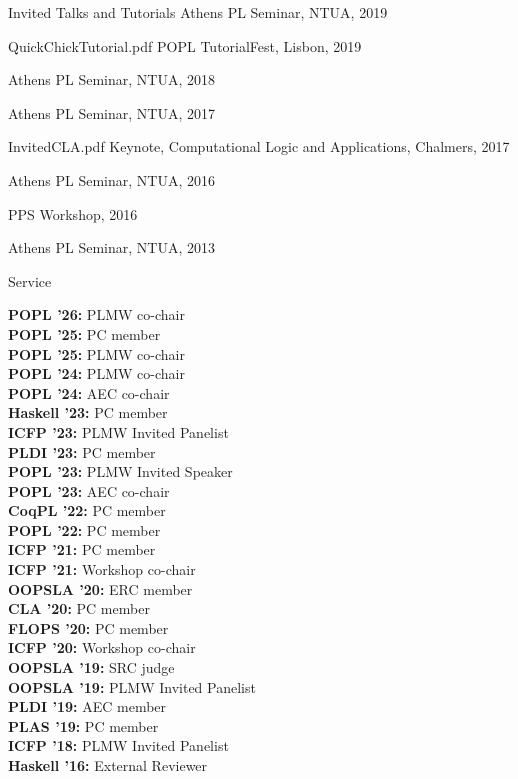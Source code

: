 \documentclass{resume} %
\begin{document}
\begin{rSection}{Invited Talks and Tutorials}
     {}
     {Athens PL Seminar, NTUA, 2019}

    {}
    {}
  
    {QuickChickTutorial.pdf}
    {POPL TutorialFest, Lisbon, 2019}

     {}
     {Athens PL Seminar, NTUA, 2018}

     {}
     {Athens PL Seminar, NTUA, 2017}

     {InvitedCLA.pdf}
     {Keynote, Computational Logic and Applications, Chalmers, 2017}

     {}
     {Athens PL Seminar, NTUA, 2016}

     {}
     {PPS Workshop, 2016}

     {}
     {Athens PL Seminar, NTUA, 2013}
     
\end{rSection}


\newcommand{\serve}[2]{
  {\bf #1:} #2 \\
  }


\begin{rSection}{Service}

  \serve{POPL '26}{PLMW co-chair}
  \serve{POPL '25}{PC member}  
  \serve{POPL '25}{PLMW co-chair}
  \serve{POPL '24}{PLMW co-chair}
  \serve{POPL '24}{AEC co-chair}  
  \serve{Haskell '23}{PC member}  
  \serve{ICFP '23}{PLMW Invited Panelist}
  \serve{PLDI '23}{PC member}
  \serve{POPL '23}{PLMW Invited Speaker}  
  \serve{POPL '23}{AEC co-chair}
  \serve{CoqPL '22}{PC member}
  \serve{POPL '22}{PC member}
  \serve{ICFP '21}{PC member}
  \serve{ICFP '21}{Workshop co-chair}
  \serve{OOPSLA '20}{ERC member}
  \serve{CLA '20}{PC member}
  \serve{FLOPS '20}{PC member}
  \serve{ICFP '20}{Workshop co-chair}
  \serve{OOPSLA '19}{SRC judge}
  \serve{OOPSLA '19}{PLMW Invited Panelist}
  \serve{PLDI '19}{AEC member}
  \serve{PLAS '19}{PC member}
  \serve{ICFP '18}{PLMW Invited Panelist}
  \serve{Haskell '16}{External Reviewer}
  
\end{rSection}
\end{document}
